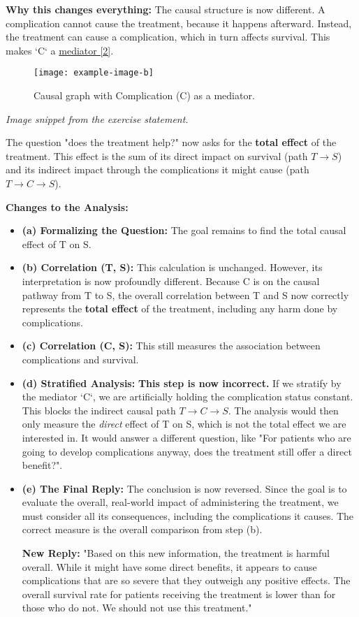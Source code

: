 \documentclass[11pt,a4paper]{article}
\begin{document}
\textbf{Why this changes everything:}
The causal structure is now different. A complication cannot cause the treatment, because it happens afterward. Instead, the treatment can cause a complication, which in turn affects survival. This makes `C` a \hyperref[sec:mediation]{mediator [2]}.

\begin{figure}[H]
    \centering
    \texttt{[image: example-image-b]}
    \caption{Causal graph with Complication (C) as a mediator.}
    \label{fig:mediator_graph}
\end{figure}
\textit{Image snippet from the exercise statement.}

The question "does the treatment help?" now asks for the \textbf{total effect} of the treatment. This effect is the sum of its direct impact on survival (path $T \to S$) and its indirect impact through the complications it might cause (path $T \to C \to S$).

\textbf{Changes to the Analysis:}
\begin{itemize}
    \item \textbf{(a) Formalizing the Question:} The goal remains to find the total causal effect of T on S.
    \item \textbf{(b) Correlation (T, S):} This calculation is unchanged. However, its interpretation is now profoundly different. Because C is on the causal pathway from T to S, the overall correlation between T and S now correctly represents the \textbf{total effect} of the treatment, including any harm done by complications.
    \item \textbf{(c) Correlation (C, S):} This still measures the association between complications and survival.
    \item \textbf{(d) Stratified Analysis:} \textbf{This step is now incorrect.} If we stratify by the mediator `C`, we are artificially holding the complication status constant. This blocks the indirect causal path $T \to C \to S$. The analysis would then only measure the \textit{direct} effect of T on S, which is not the total effect we are interested in. It would answer a different question, like "For patients who are going to develop complications anyway, does the treatment still offer a direct benefit?".
    \item \textbf{(e) The Final Reply:} The conclusion is now reversed. Since the goal is to evaluate the overall, real-world impact of administering the treatment, we must consider all its consequences, including the complications it causes. The correct measure is the overall comparison from step (b).

    \textbf{New Reply:} "Based on this new information, the treatment is harmful overall. While it might have some direct benefits, it appears to cause complications that are so severe that they outweigh any positive effects. The overall survival rate for patients receiving the treatment is lower than for those who do not. We should not use this treatment."
\end{itemize}
\end{document}
